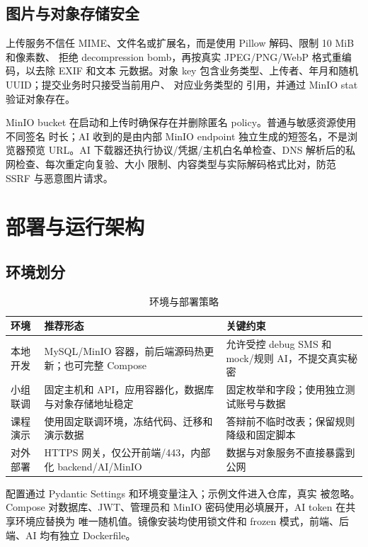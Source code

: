 \subsection{图片与对象存储安全}

上传服务不信任 MIME、文件名或扩展名，而是使用 Pillow 解码、限制 10 MiB 和像素数、
拒绝 decompression bomb，再按真实 JPEG/PNG/WebP 格式重编码，以去除 EXIF 和文本
元数据。对象 key 包含业务类型、上传者、年月和随机 UUID；提交业务时只接受当前用户、
对应业务类型的  引用，并通过 MinIO stat 验证对象存在。

MinIO bucket 在启动和上传时确保存在并删除匿名 policy。普通与敏感资源使用不同签名
时长；AI 收到的是由内部 MinIO endpoint 独立生成的短签名，不是浏览器预览 URL。AI
下载器还执行协议/凭据/主机白名单检查、DNS 解析后的私网检查、每次重定向复验、大小
限制、内容类型与实际解码格式比对，防范 SSRF 与恶意图片请求。

\section{部署与运行架构}

\subsection{环境划分}

\begin{table}[H]
  \centering
  \caption{环境与部署策略}
  \begin{tabularx}{\textwidth}{L{2.8cm}Y Y}
    \toprule
    环境 & 推荐形态 & 关键约束 \\
    \midrule
    本地开发 & MySQL/MinIO 容器，前后端源码热更新；也可完整 Compose & 允许受控 debug SMS 和 mock/规则 AI，不提交真实秘密 \\
    小组联调 & 固定主机和 API，应用容器化，数据库与对象存储地址稳定 & 固定枚举和字段；使用独立测试账号与数据 \\
    课程演示 & 使用固定联调环境，冻结代码、迁移和演示数据 & 答辩前不临时改表；保留规则降级和固定脚本 \\
    对外部署 & HTTPS 网关，仅公开前端/443，内部化 backend/AI/MinIO & 数据与对象服务不直接暴露到公网 \\
    \bottomrule
  \end{tabularx}
\end{table}

配置通过 Pydantic Settings 和环境变量注入；示例文件进入仓库，真实  被忽略。
Compose 对数据库、JWT、管理员和 MinIO 密码使用必填展开，AI token 在共享环境应替换为
唯一随机值。镜像安装均使用锁文件和 frozen 模式，前端、后端、AI 均有独立 Dockerfile。

